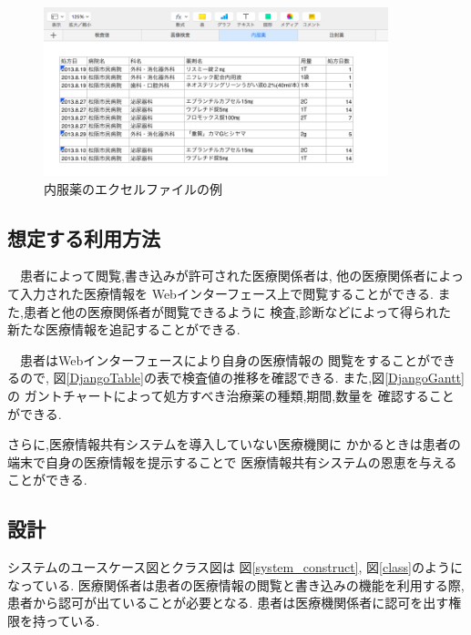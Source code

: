   \begin{figure}[htbp]
    \begin{center}
      \includegraphics[width=10cm, bb=0 0 850 411]{./gazou/excel-data-medicine.png}
    \end{center}
    \caption{内服薬のエクセルファイルの例}
    \label{excel-data-medicine}
  \end{figure}


\subsection{想定する利用方法}
  　患者によって閲覧,書き込みが許可された医療関係者は,
  他の医療関係者によって入力された医療情報を
  Webインターフェース上で閲覧することができる.
  また,患者と他の医療関係者が閲覧できるように
  検査,診断などによって得られた
  新たな医療情報を追記することができる.

  　患者はWebインターフェースにより自身の医療情報の
  閲覧をすることができるので,
  図\ref{DjangoTable}の表で検査値の推移を確認できる.
  また,図\ref{DjangoGantt}の
  ガントチャートによって処方すべき治療薬の種類,期間,数量を
  確認することができる.

  さらに,医療情報共有システムを導入していない医療機関に
  かかるときは患者の端末で自身の医療情報を提示することで
  医療情報共有システムの恩恵を与えることができる.


\subsection{設計}
  システムのユースケース図とクラス図は
  図\ref{system_construct},
  図\ref{class}のようになっている.
  医療関係者は患者の医療情報の閲覧と書き込みの機能を利用する際,
  患者から認可が出ていることが必要となる.
  患者は医療機関係者に認可を出す権限を持っている.

